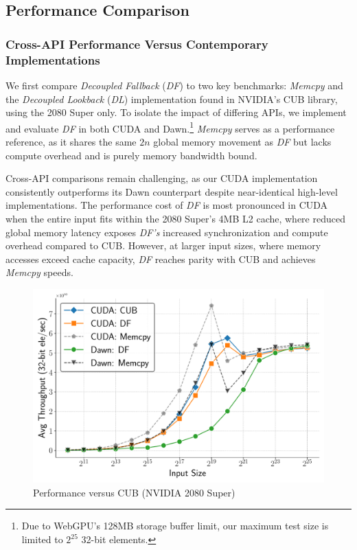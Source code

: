 \documentclass[sigconf]{acmart}
\begin{document}
\subsection{Performance Comparison}
\subsubsection{Cross-API Performance Versus Contemporary Implementations}
We first compare \emph{Decoupled Fallback} (\emph{DF}) to two key benchmarks: \emph{Memcpy}\textdagger{~\ref{sec:memcpy}} and the \emph{Decoupled Lookback} (\emph{DL}) implementation found in NVIDIA’s CUB library, using the 2080 Super only. To isolate the impact of differing APIs, we implement and evaluate \emph{DF} in both CUDA and Dawn.\footnote{Due to WebGPU’s 128MB storage buffer limit, our maximum test size is limited to $2^{25}$ 32-bit elements.} \emph{Memcpy} serves as a performance reference, as it shares the same $2n$ global memory movement as \emph{DF} but lacks compute overhead and is purely memory bandwidth bound.

Cross-API comparisons remain challenging, as our CUDA implementation consistently outperforms its Dawn counterpart despite near-identical high-level implementations. The performance cost of \emph{DF} is most pronounced in CUDA when the entire input fits within the 2080 Super’s 4MB L2 cache, where reduced global memory latency exposes \emph{DF's} increased synchronization and compute overhead compared to CUB\@. However, at larger input sizes, where memory accesses exceed cache capacity, \emph{DF} reaches parity with CUB and achieves \emph{Memcpy} speeds.

\begin{figure}
  \centering
  \includegraphics[width=\linewidth]{graphics/cuda_plot.pdf}
  \caption{Performance versus CUB (NVIDIA 2080 Super)}
\end{figure}
\end{document}
